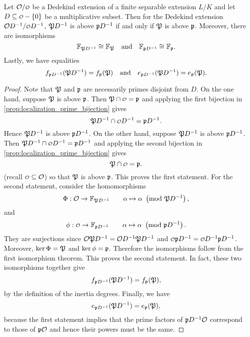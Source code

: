     \begin{proposition}\label{prop:ramification_setup_respects_localization}
      Let $\mc{O}/\smc{O}$ be a Dedekind extension of a finite separable extension $L/K$ and let $D \subseteq \smc{O}-\{0\}$ be a multiplicative subset. Then for the Dedekind extension $\mc{O}D^{-1}/\smc{O}D^{-1}$, $\mathfrak{P}D^{-1}$ is above $\mathfrak{p}D^{-1}$ if and only if $\mathfrak{P}$ is above $\mathfrak{p}$. Moreover, there are isomorphisms
      \[
        \mathbb{F}_{\mathfrak{P}D^{-1}} \cong \mathbb{F}_{\mathfrak{P}} \quad \text{and} \quad \mathbb{F}_{\mathfrak{p}D^{-1}} \cong \mathbb{F}_{\mathfrak{p}}.
      \]
      Lastly, we have equalities
      \[
        f_{\mathfrak{p}D^{-1}}(\mathfrak{P}D^{-1}) = f_{\mathfrak{p}}(\mathfrak{P}) \quad \text{and} \quad e_{\mathfrak{p}D^{-1}}(\mathfrak{P}D^{-1}) = e_{\mathfrak{p}}(\mathfrak{P}).
      \]
    \end{proposition}
    \begin{proof}
      Note that $\mathfrak{P}$ and $\mathfrak{p}$ are necessarily primes disjoint from $D$. On the one hand, suppose $\mathfrak{P}$ is above $\mathfrak{p}$. Then $\mf{P} \cap \smc{O} = \mf{p}$ and applying the first bijection in \cref{prop:localization_prime_bijection} gives
      \[
        \mf{P}D^{-1} \cap \smc{O}D^{-1} = \mf{p}D^{-1}.
      \]
      Hence $\mathfrak{P}D^{-1}$ is above $\mathfrak{p}D^{-1}$. On the other hand, suppose $\mathfrak{P}D^{-1}$ is above $\mathfrak{p}D^{-1}$. Then $\mf{P}D^{-1} \cap \smc{O}D^{-1} = \mf{p}D^{-1}$ and applying the second bijection in \cref{prop:localization_prime_bijection} gives
      \[
        \mf{P} \cap \smc{O} = \mf{p}.
      \]
      (recall $\smc{O} \subseteq \mc{O}$) so that $\mathfrak{P}$ is above $\mathfrak{p}$. This proves the first statement. For the second statement, consider the homomorphisms
      \[
        \Phi:\mathcal{O} \to \mathbb{F}_{\mathfrak{P}D^{-1}} \qquad \alpha \mapsto \alpha \ \left(\text{mod }\mathfrak{P}D^{-1}\right),
      \]
      and
      \[
        \phi:\smc{O} \to \F_{\mf{p}D^{-1}} \qquad \a \mapsto \a \tmod{\mf{p}D^{-1}}.
      \]
      They are surjections since $\mathcal{O}\mathfrak{P}D^{-1} = \mathcal{O}D^{-1}\mathfrak{P}D^{-1}$ and $\smc{O}\mf{p}D^{-1} = \smc{O}D^{-1}\mf{p}D^{-1}$. Moreover, $\ker\Phi = \mathfrak{P}$ and $\ker\phi = \mathfrak{p}$. Therefore the isomorphisms follow from the first isomorphism theorem. This proves the second statement. In fact, these two isomorphisms together give
      \[
        f_{\mathfrak{p}D^{-1}}(\mathfrak{P}D^{-1}) = f_{\mathfrak{p}}(\mathfrak{P}),
      \]
      by the definition of the inertia degrees. Finally, we have
      \[
        e_{\mathfrak{p}D^{-1}}(\mathfrak{P}D^{-1}) = e_{\mathfrak{p}}(\mathfrak{P}),
      \]
      because the first statement implies that the prime factors of $\mathfrak{p}D^{-1}\mathcal{O}$ correspond to those of $\mathfrak{p}\mathcal{O}$ and hence their powers must be the same.
    \end{proof}

